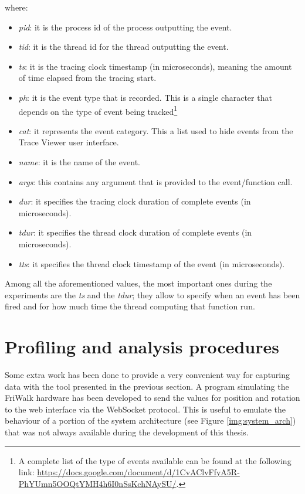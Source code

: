 where:
\begin{itemize}
    \item \emph{pid}: it is the process id of the process outputting the event.
    \item \emph{tid}: it is the thread id for the thread outputting the event.
    \item \emph{ts}: it is the tracing clock timestamp (in microseconds), meaning
        the amount of time elapsed from the tracing start.
    \item \emph{ph}: it is the event type that is recorded. This is a single character
        that depends on the type of event being tracked\footnote{A complete list
        of the type of events available can be found at the following link:
        \url{https://docs.google.com/document/d/1CvAClvFfyA5R-PhYUmn5OOQtYMH4h6I0nSsKchNAySU/}.}
    \item \emph{cat}: it represents the event category. This a list used to hide
        events from the Trace Viewer user interface.
    \item \emph{name}: it is the name of the event.
    \item \emph{args}: this contains any argument that is provided to the event/function
        call.
    \item \emph{dur}: it specifies the tracing clock duration of complete events
        (in microseconds).
    \item \emph{tdur}: it specifies the thread clock duration of complete events
        (in microseconds).
    \item \emph{tts}: it specifies the thread clock timestamp of the event (in
        microseconds).
\end{itemize}

Among all the aforementioned values, the most important ones during the experiments
are the \emph{ts} and the \emph{tdur}; they allow to specify when an event has been
fired and for how much time the thread computing that function run.


\section{Profiling and analysis procedures} \label{sec:procedure}
Some extra work has been done to provide a very convenient way
for capturing data with the tool presented in the previous section. A program
simulating the FriWalk hardware has been developed to send the values for position
and rotation to the web
interface via the WebSocket protocol. This is useful to emulate the behaviour of
a portion of the system architecture (see Figure \ref{img:system_arch}) that was
not always available during the development of this thesis.

